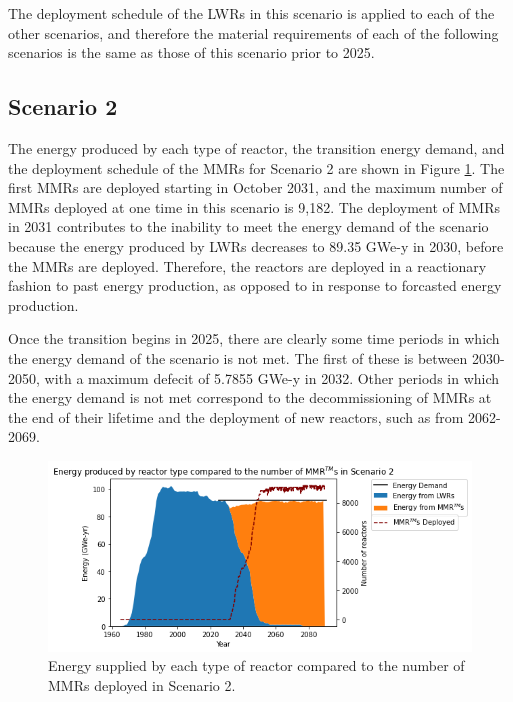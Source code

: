 The deployment schedule of the \glspl{LWR} in this scenario is 
applied to each of the other scenarios, and therefore the material 
requirements of each of the following scenarios is the same as those 
of this scenario prior to 2025. 

\subsection{Scenario 2}
The energy produced by each type of reactor, the transition energy demand, 
and the deployment schedule of the \glspl{MMR} for Scenario 2 are shown in 
Figure \ref{fig:energy_rx_2}. The first \glspl{MMR} are deployed starting in 
October 2031, and the 
maximum number of \glspl{MMR} deployed at one time in this scenario is 
9,182. The deployment of \glspl{MMR} in 2031 contributes to the inability to 
meet the energy demand of the scenario because the energy produced by 
\glspl{LWR} decreases to 89.35 GWe-y in 2030, before the \glspl{MMR} are 
deployed. Therefore, the reactors are deployed in a reactionary fashion to 
past energy production, as opposed to in response to forcasted energy 
production.

Once the transition begins in 2025, there are 
clearly some time periods in which the energy demand of the scenario is 
not met. The first of these is between 2030-2050, with a maximum defecit 
of 5.7855 GWe-y in 2032. Other periods in which the energy demand is not met 
correspond to the decommissioning of \glspl{MMR} at the end of their lifetime 
and the deployment of new reactors, such as from 2062-2069. 

\begin{figure}
    \centering 
    \includegraphics[scale=0.5]{figures/energy_scenario2.png}
    \caption{Energy supplied by each type of reactor compared to the number of 
    \glspl{MMR} deployed in Scenario 2.}
    \label{fig:energy_rx_2}
\end{figure}

